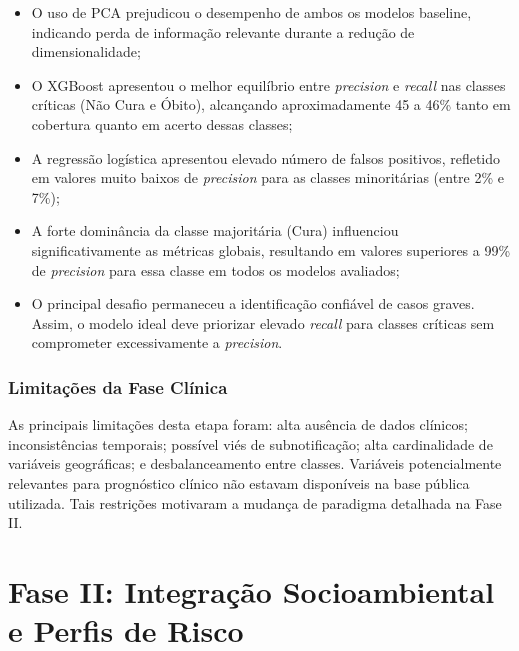 \documentclass[12pt]{article}
\begin{document}
\begin{itemize}
    \item O uso de PCA prejudicou o desempenho de ambos os modelos baseline, indicando
    perda de informação relevante durante a redução de dimensionalidade;

    \item O XGBoost apresentou o melhor equilíbrio entre \textit{precision} e
    \textit{recall} nas classes críticas (Não Cura e Óbito), alcançando aproximadamente
    45 a 46\% tanto em cobertura quanto em acerto dessas classes;

    \item A regressão logística apresentou elevado número de falsos positivos, refletido
    em valores muito baixos de \textit{precision} para as classes minoritárias (entre 2\%
    e 7\%);

    \item A forte dominância da classe majoritária (Cura) influenciou significativamente
    as métricas globais, resultando em valores superiores a 99\% de \textit{precision}
    para essa classe em todos os modelos avaliados;

    \item O principal desafio permaneceu a identificação confiável de casos graves.
    Assim, o modelo ideal deve priorizar elevado \textit{recall} para classes críticas
    sem comprometer excessivamente a \textit{precision}.
\end{itemize}

\subsubsection{Limitações da Fase Clínica}

As principais limitações desta etapa foram: alta ausência de dados clínicos;
inconsistências temporais; possível viés de subnotificação; alta cardinalidade de
variáveis geográficas; e desbalanceamento entre classes. Variáveis potencialmente
relevantes para prognóstico clínico não estavam disponíveis na base pública utilizada.
Tais restrições motivaram a mudança de paradigma detalhada na Fase II.

\section{Fase II: Integração Socioambiental e Perfis de Risco}
\end{document}

